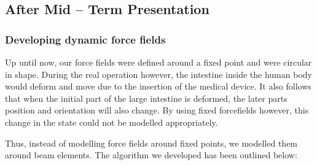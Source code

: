 \documentclass[12pt]{report}
\begin{document}

\par

\par

\subsection*{After Mid – Term Presentation}
\subsubsection*{Developing dynamic force fields}
Up until now, our force fields were defined around a fixed point and were circular in shape. During the real operation however, the intestine inside the human body would deform and move due to the insertion of the medical device. It also follows that when the initial part of the large intestine is deformed, the later parts position and orientation will also change. By using fixed forcefields however, this change in the state could not be modelled appropriately.\par

Thus, instead of modelling force fields around fixed points, we modelled them around beam elements. The algorithm we developed has been outlined below:\par
\end{document}
